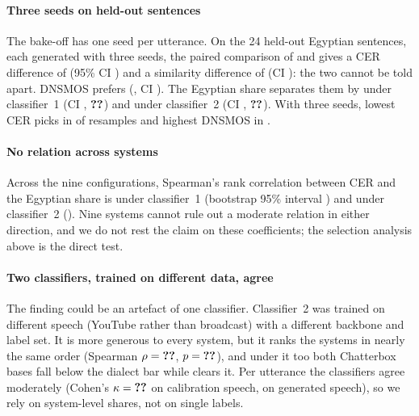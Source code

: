 \paragraph{Three seeds on held-out sentences}
The bake-off has one seed per utterance. On the 24 held-out Egyptian sentences, each generated with three seeds, the
paired comparison of \vox and \cbthree gives a CER difference of 
(95\% CI ) and a similarity difference of
 (CI ): the two
cannot be told apart. DNSMOS prefers \cbthree (, CI
). The Egyptian share separates them by
 under classifier~1 (CI ,
$\R{pt:voxcpm2_minus_cb-v3:egy_main:c1:pholm}$) and  under classifier~2
(CI , $\R{pt:voxcpm2_minus_cb-v3:egy_main:c2:pholm}$). With three seeds,
lowest CER picks \cbthree in  of resamples and highest DNSMOS in .

\paragraph{No relation across systems}
Across the nine configurations, Spearman's rank correlation between CER and the Egyptian share is
 under classifier~1 (bootstrap 95\% interval ) and  under classifier~2
(). Nine systems cannot rule out a moderate relation in either direction, and we do not rest the claim
on these coefficients; the selection analysis above is the direct test.

\paragraph{Two classifiers, trained on different data, agree}
The finding could be an artefact of one classifier. Classifier~2 was trained on different speech (YouTube rather
than broadcast) with a different backbone and label set. It is more generous to every system, but it ranks the
systems in nearly the same order (Spearman $\rho=\R{rank:c1c2:rho}$, $p=\R{rank:c1c2:p}$), and under it too both
Chatterbox bases fall below the dialect bar while \vox clears it. Per utterance the classifiers agree moderately
(Cohen's $\kappa=\R{kappa:real}$ on calibration speech,  on generated speech), so we rely on system-level
shares, not on single labels.

